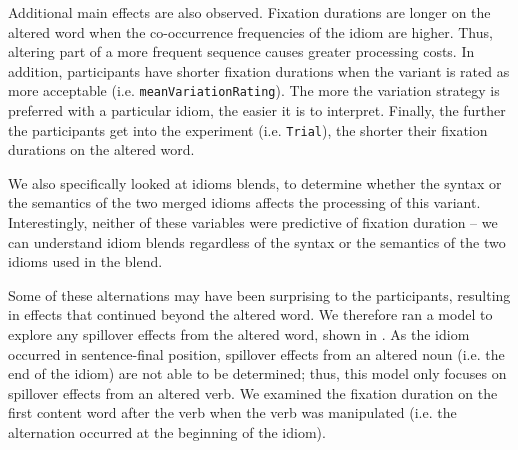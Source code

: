 \documentclass[output=paper,modfonts,nonflat]{langsci/langscibook}
\begin{document}
Additional main effects are also observed. Fixation durations are longer on the altered word when the co-occurrence frequencies of the idiom are higher. Thus, altering part of a more frequent sequence causes greater processing costs. In addition, participants have shorter fixation durations when the variant is rated as more acceptable (i.e. \texttt{meanVariationRating}). The more the variation strategy is preferred with a particular idiom, the easier it is to interpret. Finally, the further the participants get into the experiment (i.e. \texttt{Trial}), the shorter their fixation durations on the altered word. 

We also specifically looked at idioms blends, to determine whether the syntax or the semantics of the two merged idioms affects the processing of this variant. Interestingly, neither of these variables were predictive of fixation duration -- we can understand idiom blends regardless of the syntax or the semantics of the two idioms used in the blend.




Some of these alternations may have been surprising to the participants, resulting in effects that continued beyond the altered word. We therefore ran a model to explore any spillover effects from the altered word, shown in . As the idiom occurred in sentence-final position, spillover effects from an altered noun (i.e. the end of the idiom) are not able to be determined; thus, this model only focuses on spillover effects from an altered verb. We examined the fixation duration on the first content word after the verb when the verb was manipulated (i.e. the alternation occurred at the beginning of the idiom).  
\end{document}
